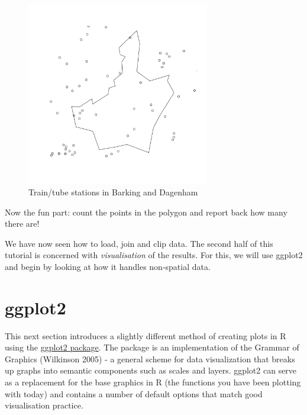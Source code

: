 \documentclass[]{article}
\newenvironment{Shaded}{}{}
\newcommand{\KeywordTok}[1]{\textcolor[rgb]{0.00,0.44,0.13}{\textbf{{#1}}}}
\newcommand{\StringTok}[1]{\textcolor[rgb]{0.25,0.44,0.63}{{#1}}}
\newcommand{\NormalTok}[1]{{#1}}
\let\Oldincludegraphics\includegraphics
\renewcommand{\includegraphics}[1]{\Oldincludegraphics[width=8cm]{#1}}
\begin{document}
\begin{Shaded}
\end{Shaded}
\begin{figure}[htbp]
\centering
\includegraphics{figure/Train/tube_stations_in_Barking_and_Dagenham.png}
\caption{Train/tube stations in Barking and Dagenham}
\end{figure}

Now the fun part: count the points in the polygon and report back how
many there are!

We have now seen how to load, join and clip data. The second half of
this tutorial is concerned with \emph{visualisation} of the results. For
this, we will use ggplot2 and begin by looking at how it handles
non-spatial data.

\section{ggplot2}

This next section introduces a slightly different method of creating
plots in R using the \href{http://ggplot2.org/}{ggplot2 package}. The
package is an implementation of the Grammar of Graphics (Wilkinson 2005)
- a general scheme for data visualization that breaks up graphs into
semantic components such as scales and layers. ggplot2 can serve as a
replacement for the base graphics in R (the functions you have been
plotting with today) and contains a number of default options that match
good visualisation practice.
\end{document}
